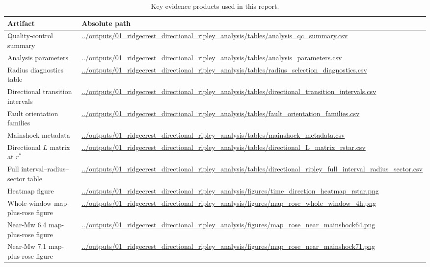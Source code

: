 \documentclass[11pt]{article}
\begin{document}
\begin{table}[H]
\centering
\caption{Key evidence products used in this report.}
\label{tab:outputs}
\begin{tabularx}{\textwidth}{@{}l>{\raggedright\arraybackslash}X@{}}
\toprule
Artifact & Absolute path \\
\midrule
Quality-control summary & \url{../outputs/01_ridgecrest_directional_ripley_analysis/tables/analysis_qc_summary.csv} \\
Analysis parameters & \url{../outputs/01_ridgecrest_directional_ripley_analysis/tables/analysis_parameters.csv} \\
Radius diagnostics table & \url{../outputs/01_ridgecrest_directional_ripley_analysis/tables/radius_selection_diagnostics.csv} \\
Directional transition intervals & \url{../outputs/01_ridgecrest_directional_ripley_analysis/tables/directional_transition_intervals.csv} \\
Fault orientation families & \url{../outputs/01_ridgecrest_directional_ripley_analysis/tables/fault_orientation_families.csv} \\
Mainshock metadata & \url{../outputs/01_ridgecrest_directional_ripley_analysis/tables/mainshock_metadata.csv} \\
Directional $L$ matrix at $r^{\ast}$ & \url{../outputs/01_ridgecrest_directional_ripley_analysis/tables/directional_L_matrix_rstar.csv} \\
Full interval--radius--sector table & \url{../outputs/01_ridgecrest_directional_ripley_analysis/tables/directional_ripley_full_interval_radius_sector.csv} \\
Heatmap figure & \url{../outputs/01_ridgecrest_directional_ripley_analysis/figures/time_direction_heatmap_rstar.png} \\
Whole-window map-plus-rose figure & \url{../outputs/01_ridgecrest_directional_ripley_analysis/figures/map_rose_whole_window_4h.png} \\
Near-Mw 6.4 map-plus-rose figure & \url{../outputs/01_ridgecrest_directional_ripley_analysis/figures/map_rose_near_mainshock64.png} \\
Near-Mw 7.1 map-plus-rose figure & \url{../outputs/01_ridgecrest_directional_ripley_analysis/figures/map_rose_near_mainshock71.png} \\
\bottomrule
\end{tabularx}
\end{table}
\end{document}
